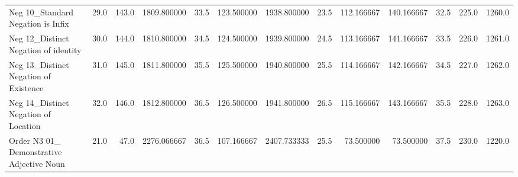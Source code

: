 \begin{tabular}{lrrrrrrrrrrrr}
Neg 10\_Standard Negation is Infix                  &          29.0 &         143.0 &   1809.800000 &       33.5 &  123.500000 &  1938.800000 &         23.5 &   112.166667 &   140.166667 &                  32.5 &                 225.0 &                1260.0 \\
Neg 12\_Distinct Negation of identity               &          30.0 &         144.0 &   1810.800000 &       34.5 &  124.500000 &  1939.800000 &         24.5 &   113.166667 &   141.166667 &                  33.5 &                 226.0 &                1261.0 \\
Neg 13\_Distinct Negation of Existence              &          31.0 &         145.0 &   1811.800000 &       35.5 &  125.500000 &  1940.800000 &         25.5 &   114.166667 &   142.166667 &                  34.5 &                 227.0 &                1262.0 \\
Neg 14\_Distinct Negation of Location               &          32.0 &         146.0 &   1812.800000 &       36.5 &  126.500000 &  1941.800000 &         26.5 &   115.166667 &   143.166667 &                  35.5 &                 228.0 &                1263.0 \\
Order N3 01\_ Demonstrative Adjective Noun          &          21.0 &          47.0 &   2276.066667 &       36.5 &  107.166667 &  2407.733333 &         25.5 &    73.500000 &    73.500000 &                  37.5 &                 230.0 &                1220.0 \\
\bottomrule
\end{tabular}

